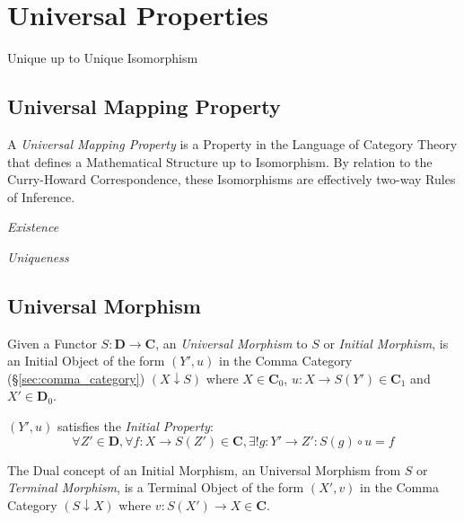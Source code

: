 \section{Universal Properties}\label{sec:universal_property}

Unique up to Unique Isomorphism



\subsection{Universal Mapping Property}
\label{sec:universal_mapping_property}

A \emph{Universal Mapping Property} is a Property in the Language of
Category Theory that defines a Mathematical Structure up to
Isomorphism. By relation to the Curry-Howard Correspondence, these
Isomorphisms are effectively two-way Rules of Inference.

\emph{Existence}

\emph{Uniqueness}



\subsection{Universal Morphism}\label{sec:universal_morphism}

Given a Functor $S: \mathbf{D} \rightarrow \mathbf{C}$, an
\emph{Universal Morphism} to $S$ or \emph{Initial Morphism}, is an
Initial Object of the form $(Y',u)$ in the Comma Category
(\S\ref{sec:comma_category}) $(X \downarrow S)$ where $X \in
\mathbf{C}_0$, $u : X \rightarrow S(Y') \in \mathbf{C}_1$ and $X' \in
\mathbf{D}_0$.

$(Y', u)$ satisfies the \emph{Initial Property}:
\[
  \forall Z' \in \mathbf{D}, \forall f : X \rightarrow S(Z') \in
  \mathbf{C}, \exists! g : Y' \rightarrow Z' : S(g) \circ u = f
\]

The Dual concept of an Initial Morphism, an Universal Morphism from
$S$ or \emph{Terminal Morphism}, is a Terminal Object of the form
$(X',v)$ in the Comma Category $(S \downarrow X)$ where $v : S(X')
\rightarrow X \in \mathbf{C}$.

